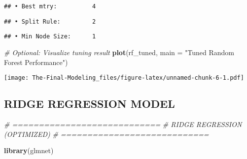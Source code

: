 \documentclass[
]{article}
\newenvironment{Shaded}{\begin{snugshade}}{\end{snugshade}}
\newcommand{\AttributeTok}[1]{\textcolor[rgb]{0.13,0.29,0.53}{#1}}
\newcommand{\CommentTok}[1]{\textcolor[rgb]{0.56,0.35,0.01}{\textit{#1}}}
\newcommand{\FunctionTok}[1]{\textcolor[rgb]{0.13,0.29,0.53}{\textbf{#1}}}
\newcommand{\NormalTok}[1]{#1}
\newcommand{\SpecialCharTok}[1]{\textcolor[rgb]{0.81,0.36,0.00}{\textbf{#1}}}
\newcommand{\StringTok}[1]{\textcolor[rgb]{0.31,0.60,0.02}{#1}}
\begin{document}
\begin{verbatim}
## • Best mtry:          4
\end{verbatim}

\begin{Shaded}
\end{Shaded}

\begin{verbatim}
## • Split Rule:         2
\end{verbatim}

\begin{Shaded}
\end{Shaded}

\begin{verbatim}
## • Min Node Size:      1
\end{verbatim}

\begin{Shaded}
\begin{Highlighting}[]
\CommentTok{\# Optional: Visualize tuning result}
\FunctionTok{plot}\NormalTok{(rf\_tuned, }\AttributeTok{main =} \StringTok{"Tuned Random Forest Performance"}\NormalTok{)}
\end{Highlighting}
\end{Shaded}

\texttt{[image: The-Final-Modeling\_files/figure-latex/unnamed-chunk-6-1.pdf]}

\subsection{RIDGE REGRESSION MODEL}\label{ridge-regression-model}

\begin{Shaded}
\begin{Highlighting}[]
\CommentTok{\# ============================}
\CommentTok{\#  RIDGE REGRESSION (OPTIMIZED)}
\CommentTok{\# ============================}

\FunctionTok{library}\NormalTok{(glmnet)}
\end{Highlighting}
\end{Shaded}
\end{document}
